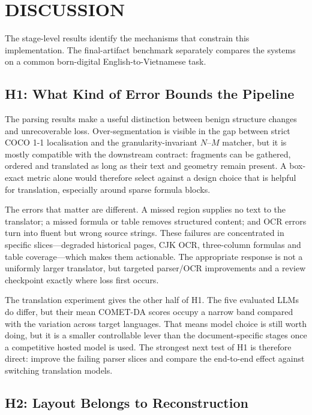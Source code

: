 \section{DISCUSSION}
\label{sec:discussion}

The stage-level results identify the mechanisms that constrain this
implementation. The final-artifact benchmark separately compares the systems on
a common born-digital English-to-Vietnamese task.

\subsection{H1: What Kind of Error Bounds the Pipeline}
\label{subsec:disc-structure}

The parsing results make a useful distinction between benign structure changes
and unrecoverable loss. Over-segmentation is visible in the gap between strict
COCO 1-1 localisation and the granularity-invariant $N$--$M$ matcher, but it is
mostly compatible with the downstream contract: fragments can be gathered,
ordered and translated as long as their text and geometry remain present. A
box-exact metric alone would therefore select against a design choice that is
helpful for translation, especially around sparse formula blocks.

The errors that matter are different. A missed region supplies no text to the
translator; a missed formula or table removes structured content; and OCR errors
turn into fluent but wrong source strings. These failures are concentrated in
specific slices---degraded historical pages, CJK OCR, three-column formulas and
table coverage---which makes them actionable. The appropriate response is not a
uniformly larger translator, but targeted parser/OCR improvements and a review
checkpoint exactly where loss first occurs.

The translation experiment gives the other half of H1. The five evaluated LLMs
do differ, but their mean COMET-DA scores occupy a narrow band compared with the
variation across target languages. That means model choice is still worth doing,
but it is a smaller controllable lever than the document-specific stages once a
competitive hosted model is used. The strongest next test of H1 is therefore
direct: improve the failing parser slices and compare the end-to-end effect
against switching translation models.

\subsection{H2: Layout Belongs to Reconstruction}
\label{subsec:disc-constraint}

